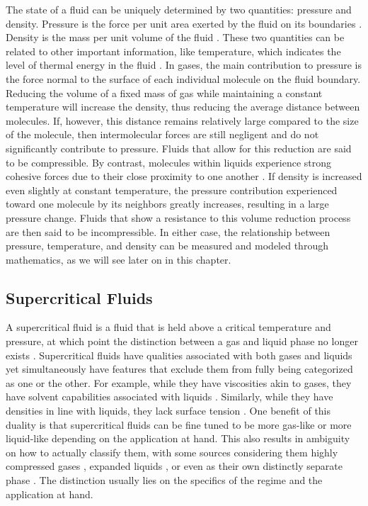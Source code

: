 The state of a fluid can be uniquely determined by two quantities: pressure and density. Pressure is the force per unit area exerted by the fluid on its boundaries \cite{PAINE19941-1}. Density is the mass per unit volume of the fluid \cite{PAINE19941-1}. These two quantities can be related to other important information, like temperature, which indicates the level of thermal energy in the fluid \cite{PAINE19941-1}. In gases, the main contribution to pressure is the force normal to the surface of each individual molecule on the fluid boundary. Reducing the volume of a fixed mass of gas while maintaining a constant temperature will increase the density, thus reducing the average distance between molecules. If, however, this distance remains relatively large compared to the size of the molecule, then intermolecular forces are still negligent and do not significantly contribute to pressure. Fluids that allow for this reduction are said to be compressible. By contrast, molecules within liquids experience strong cohesive forces due to their close proximity to one another \cite{batchelor_2000}. If density is increased even slightly at constant temperature, the pressure contribution experienced toward one molecule by its neighbors greatly increases, resulting in a large pressure change. Fluids that show a resistance to this volume reduction process are then said to be incompressible. In either case, the relationship between pressure, temperature, and density can be measured and modeled through mathematics, as we will see later on in this chapter. 

\subsection{Supercritical Fluids}

A supercritical fluid is a fluid that is held above a critical temperature and pressure, at which point the distinction between a gas and liquid phase no longer exists \cite{SCF2, SCF1}. Supercritical fluids have qualities associated with both gases and liquids yet simultaneously have features that exclude them from fully being categorized as one or the other. For example, while they have viscosities akin to gases, they have solvent capabilities associated with liquids \cite{}. Similarly, while they have densities in line with liquids, they lack surface tension \cite{}. One benefit of this duality is that supercritical fluids can be fine tuned to be more gas-like or more liquid-like depending on the application at hand. This also results in ambiguity on how to actually classify them, with some sources considering them highly compressed gases \cite{Gordon}, expanded liquids \cite{Aggarwal}, or even as their own distinctly separate phase \cite{BANUTI201512}. The distinction usually lies on the specifics of the regime and the application at hand. 

